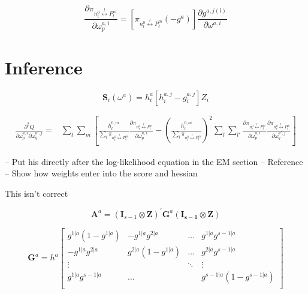 \documentclass[12pt]{article}
\begin{document}
\begin{equation} \label{eq:gatechainpartial}
  \frac{\partial \pi_{n^{0}_{t} \overset{l}{\longleftrightarrow} P^{m}_{t}}}{\partial \omega^{a,i}_{p}} = [\pi_{n^{0}_{t} \overset{l}{\longleftrightarrow} P^{m}_{t}} (-g^{a})] \frac{\partial g^{a, j(l)}}{\partial \omega^{a, i}}
\end{equation}





\section{Inference} \label{sec:Inference}

\begin{equation} \label{eq:gateScore}
  \boldsymbol{S}_{i}(\omega^{a}) = h^{a}_{i} \left[h^{a, j}_{i} - g^{a, j}_{i} \right] Z_{i}
\end{equation}


\begin{equation} \label{eq:gateHessian}
  \begin{split}
    \frac{\partial^{2} Q}{\partial \omega^{a,i}_{p} \partial \omega^{a',j}_{q}} =& \sum_{t} \sum_{m} \left[  \frac{h^{0,m}_{t}}{\sum_{l} \pi_{n^{0}_{t} \overset{l}{\longleftrightarrow} P^{m}_{t}}} \frac{\partial \pi_{n^{0}_{t} \overset{l}{\longleftrightarrow} P^{m}_{t}}}{\partial \omega^{a,i}_{p}} - \left( \frac{h^{0,m}_{t}}{\sum_{l} \pi_{n^{0}_{t} \overset{l}{\longleftrightarrow} P^{m}_{t}}} \right)^{2} \sum_{l} \sum_{l'} \frac{\partial \pi_{n^{0}_{t} \overset{l}{\longleftrightarrow} P^{m}_{t}}}{\partial \omega^{a,i}_{p}}  \frac{\partial \pi_{n^{0}_{t} \overset{l'}{\longleftrightarrow} P^{m}_{t}}}{\partial \omega^{a',j}_{q}} \right]
  \end{split}
\end{equation}

-- Put his directly after the log-likelihood equation in the EM section
-- Reference \cite{MengRubinSEM1991}
-- Show how weights enter into the score and hessian

\bigskip

This isn't correct

\begin{equation} \label{eq:gatinghessianQ}
  \mathbf{A}^{a} = (\mathbf{I}_{s-1} \otimes \mathbf{Z})^{\prime} \mathbf{G}^{a} (\mathbf{I_{s-1}} \otimes \mathbf{Z})
\end{equation}

\begin{equation} \label{eq:nodehessian}
  \mathbf{G}^{a} = h^{a} \begin{bmatrix}
     g^{1|a}(1-g^{1|a}) & -g^{1|a}g^{2|a}    & \dots  & g^{1|a}g^{s-1|a}       \\
     -g^{1|a}g^{2|a}    & g^{2|a}(1-g^{1|a}) & \dots  & g^{2|a}g^{s-1|a}       \\
     \vdots             &                    & \ddots & \vdots                 \\
     g^{1|a}g^{s-1|a}   &  \dots             &        & g^{s-1|a}(1-g^{s-1|a}) \\
  \end{bmatrix}
\end{equation}
\end{document}
